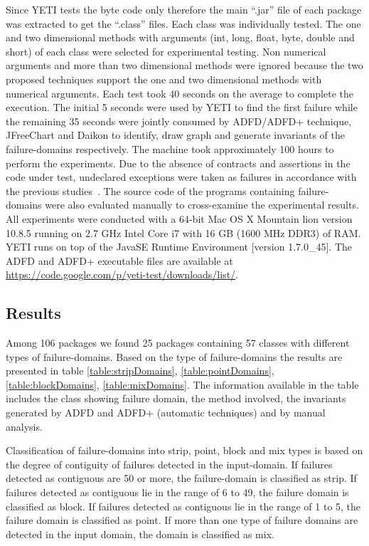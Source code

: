 \documentclass[runningheads,a4paper]{llncs}
\begin{document}
Since YETI tests the byte code only therefore the main ``.jar'' file of each package was extracted to get the ``.class'' files. Each class was individually tested. The one and two dimensional methods with arguments (int, long, float, byte, double and short) of each class were selected for experimental testing. Non numerical arguments and more than two dimensional methods were ignored because the two proposed techniques support the one and two dimensional methods with numerical arguments. Each test took 40 seconds on the average to complete the execution. The initial 5 seconds were used by YETI to find the first failure while the remaining 35 seconds were jointly consumed by ADFD/ADFD+ technique, JFreeChart and Daikon to identify, draw graph and generate invariants of the failure-domains respectively. The machine took approximately 100 hours to perform the experiments. Due to the absence of contracts and assertions in the code under test, undeclared exceptions were taken as failures in accordance with the previous studies~\cite{ahmad2013adfd}\cite{oriol2012random}. The source code of the programs containing failure-domains were also evaluated manually to cross-examine the experimental results. All experiments were conducted with a 64-bit Mac OS X Mountain lion version 10.8.5 running on 2.7 GHz Intel Core i7 with 16 GB (1600 MHz DDR3) of RAM. YETI runs on top of the Java\texttrademark  SE Runtime Environment [version 1.7.0\_45]. The ADFD and ADFD+ executable files are available at \url{https://code.google.com/p/yeti-test/downloads/list/}. 



\subsection{Results}
Among 106 packages we found 25 packages containing 57 classes with different types of failure-domains. Based on the type of failure-domains the results are presented in table \ref{table:stripDomains}, \ref{table:pointDomains}, \ref{table:blockDomains}, \ref{table:mixDomains}. The information available in the table includes the class showing failure domain, the method involved, the invariants generated by ADFD and ADFD+ (automatic techniques) and by manual analysis. 

Classification of failure-domains into strip, point, block and mix types is based on the degree of contiguity of failures detected in the input-domain. If failures detected as contiguous are 50 or more, the failure-domain is classified as strip. If failures detected as contiguous lie in the range of 6 to 49, the failure domain is classified as block. If failures detected as contiguous lie in the range of 1 to 5, the failure domain is classified as point. If more than one type of failure domains are detected in the input domain, the domain is classified as mix.
\end{document}

